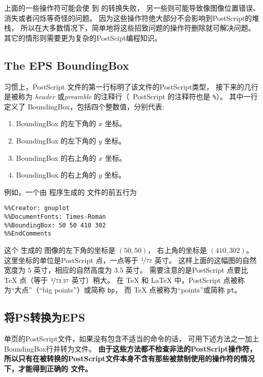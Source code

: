 上面的一些操作符可能会使 到  的转换失败，
另一些则可能导致像图像位置错误、消失或者闪烁等奇怪的问题。
因为这些操作符绝大部分不会影响到PostScript的堆栈，
所以在大多数情况下，简单地将这些招致问题的操作符删除就可解决问题。
其它的情形则需要更为复杂的PostScipt编程知识。

\subsection{The EPS BoundingBox}\label{ssec:bbox}

习惯上，PostScript 文件的第一行标明了该文件的PostScript类型，
接下来的几行是被称为 \emph{header} 或\emph{preamble} 的注释行（~PostScript 的注释符也是 \texttt{\%}）。
其中一行定义了 BoundingBox，包括四个整数值，分别代表:
\begin{enumerate}
	\item BoundingBox 的左下角的 $x$ 坐标。
	\item BoundingBox 的左下角的 $y$ 坐标。
	\item BoundingBox 的右上角的 $x$ 坐标。
	\item BoundingBox 的右上角的 $y$ 坐标。
\end{enumerate}

例如，一个由  程序生成的  文件的前五行为
\begin{Verbatim}[frame=single,rulecolor=\color{mygreen},label={\bfseries \file{eps} 文件头示例}]
%!PS-Adobe-2.0 EPSF-2.0
%%Creator: gnuplot
%%DocumentFonts: Times-Roman
%%BoundingBox: 50 50 410 302
%%EndComments
\end{Verbatim}

这个 生成的  图像的左下角的坐标是 $(50,50)$，
右上角的坐标是 $(410,302)$。
这里坐标的单位是PostScript 点，一点等于 $\nicefrac{1}{72}$ 英寸。
这样上面的这幅图的自然宽度为 $5$ 英寸，相应的自然高度为 $3.5$ 英寸。
需要注意的是PostScript 点要比 \TeX{} 点（等于 $\nicefrac{1}{72.27}$ 英寸）稍大。
在 \TeX{} 和 \LaTeX{} 中，PostScript 点被称为“大点”（``big points''）或简称 \texttt{bp}，
而 \TeX{} 点被称为``points''或简称 \texttt{pt}。

\subsection{将PS转换为EPS}\label{ssec:pstoeps}

单页的PostScript文件，如果没有包含不适当的命令的话，
可用下述方法之一加上BoundingBox行并转为文件。
\textbf{由于这些方法都不检查非法的PostScript操作符，
	所以只有在被转换的PostScript文件本身不含有那些被禁制使用的操作符的情况下，才能得到正确的 文件。}

